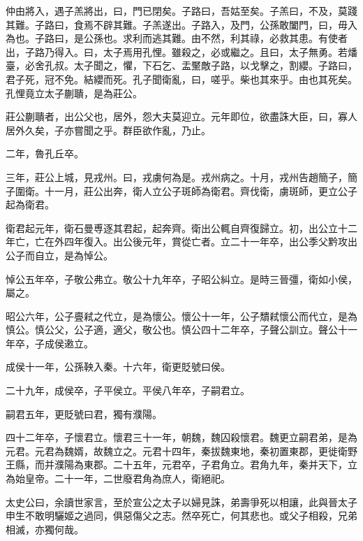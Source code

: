 仲由將入，遇子羔將出，曰，門已閉矣。子路曰，吾姑至矣。子羔曰，不及，莫踐其難。子路曰，食焉不辟其難。子羔遂出。子路入，及門，公孫敢闔門，曰，毋入為也。子路曰，是公孫也。求利而逃其難。由不然，利其祿，必救其患。有使者出，子路乃得入。曰，太子焉用孔悝。雖殺之，必或繼之。且曰，太子無勇。若燔臺，必舍孔叔。太子聞之，懼，下石乞、盂黶敵子路，以戈擊之，割纓。子路曰，君子死，冠不免。結纓而死。孔子聞衛亂，曰，嗟乎。柴也其來乎。由也其死矣。孔悝竟立太子蒯聵，是為莊公。

莊公蒯聵者，出公父也，居外，怨大夫莫迎立。元年即位，欲盡誅大臣，曰，寡人居外久矣，子亦嘗聞之乎。群臣欲作亂，乃止。

二年，魯孔丘卒。

三年，莊公上城，見戎州。曰，戎虜何為是。戎州病之。十月，戎州告趙簡子，簡子圍衛。十一月，莊公出奔，衛人立公子斑師為衛君。齊伐衛，虜斑師，更立公子起為衛君。

衛君起元年，衛石曼尃逐其君起，起奔齊。衛出公輒自齊復歸立。初，出公立十二年亡，亡在外四年復入。出公後元年，賞從亡者。立二十一年卒，出公季父黔攻出公子而自立，是為悼公。

悼公五年卒，子敬公弗立。敬公十九年卒，子昭公糾立。是時三晉彊，衛如小侯，屬之。

昭公六年，公子亹弒之代立，是為懷公。懷公十一年，公子穨弒懷公而代立，是為慎公。慎公父，公子適，適父，敬公也。慎公四十二年卒，子聲公訓立。聲公十一年卒，子成侯遫立。

成侯十一年，公孫鞅入秦。十六年，衛更貶號曰侯。

二十九年，成侯卒，子平侯立。平侯八年卒，子嗣君立。

嗣君五年，更貶號曰君，獨有濮陽。

四十二年卒，子懷君立。懷君三十一年，朝魏，魏囚殺懷君。魏更立嗣君弟，是為元君。元君為魏婿，故魏立之。元君十四年，秦拔魏東地，秦初置東郡，更徙衛野王縣，而并濮陽為東郡。二十五年，元君卒，子君角立。君角九年，秦并天下，立為始皇帝。二十一年，二世廢君角為庶人，衛絕祀。

太史公曰，余讀世家言，至於宣公之太子以婦見誅，弟壽爭死以相讓，此與晉太子申生不敢明驪姬之過同，俱惡傷父之志。然卒死亡，何其悲也。或父子相殺，兄弟相滅，亦獨何哉。